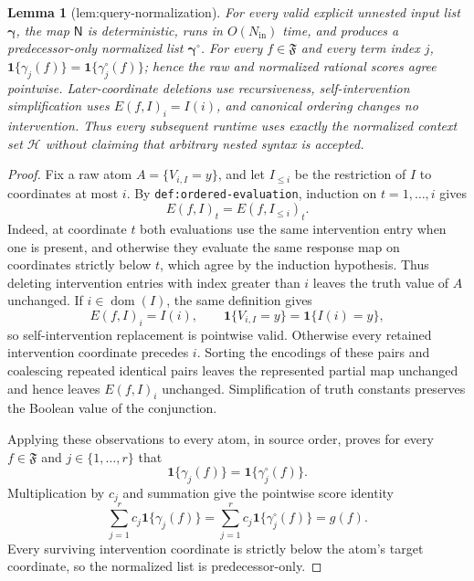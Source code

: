 \documentclass{article}
\newtheorem{lemma}{Lemma}
\begin{document}
\begin{lemma}[lem:query-normalization]\label{lem:query-normalization}
For every valid explicit unnested input list \(\boldsymbol\gamma\), the map \(\mathsf N\) is deterministic, runs in \(O(N_{\mathrm{in}})\) time, and produces a predecessor-only normalized list \(\boldsymbol\gamma^{\circ}\). For every \(f\in\mathfrak F\) and every term index \(j\), \(\mathbf 1\{\gamma_j(f)\}=\mathbf 1\{\gamma_j^{\circ}(f)\}\); hence the raw and normalized rational scores agree pointwise. Later-coordinate deletions use recursiveness, self-intervention simplification uses \(E(f,I)_i=I(i)\), and canonical ordering changes no intervention. Thus every subsequent runtime uses exactly the normalized context set \(\mathcal H\) without claiming that arbitrary nested syntax is accepted.
\end{lemma}
\begin{proof}
Fix a raw atom \(A=\{V_{i,I}=y\}\), and let \(I_{\leq i}\) be the restriction of \(I\) to coordinates at most \(i\). By \texttt{def:ordered-evaluation}, induction on \(t=1,\ldots,i\) gives
\[
 E(f,I)_t=E(f,I_{\leq i})_t.
\]
Indeed, at coordinate \(t\) both evaluations use the same intervention entry when one is present, and otherwise they evaluate the same response map on coordinates strictly below \(t\), which agree by the induction hypothesis. Thus deleting intervention entries with index greater than \(i\) leaves the truth value of \(A\) unchanged. If \(i\in\operatorname{dom}(I)\), the same definition gives
\[
 E(f,I)_i=I(i),
 \qquad
 \mathbf 1\{V_{i,I}=y\}=\mathbf 1\{I(i)=y\},
\]
so self-intervention replacement is pointwise valid. Otherwise every retained intervention coordinate precedes \(i\). Sorting the encodings of these pairs and coalescing repeated identical pairs leaves the represented partial map unchanged and hence leaves \(E(f,I)_i\) unchanged. Simplification of truth constants preserves the Boolean value of the conjunction.

Applying these observations to every atom, in source order, proves for every \(f\in\mathfrak F\) and \(j\in\{1,\ldots,r\}\) that
\[
 \mathbf 1\{\gamma_j(f)\}
 =\mathbf 1\{\gamma_j^{\circ}(f)\}.
\]
Multiplication by \(c_j\) and summation give the pointwise score identity
\[
 \sum_{j=1}^r c_j\mathbf 1\{\gamma_j(f)\}
 =\sum_{j=1}^r c_j\mathbf 1\{\gamma_j^{\circ}(f)\}
 =g(f).
\]
Every surviving intervention coordinate is strictly below the atom's target coordinate, so the normalized list is predecessor-only.


\end{proof}
\end{document}
